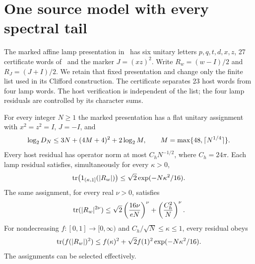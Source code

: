 \section{One source model with every spectral tail}\label{sec:source}
The marked affine lamp presentation in~\cite[Section P2]{UP} has six unitary letters $p,q,t,d,x,z$, 27 certificate words of~\cite[Definition 7.1]{Game} and the marker $J=(xz)^2$. Write $R_w=(w-I)/2$ and $R_J=(J+I)/2$. We retain that fixed presentation and change only the finite list used in its Clifford construction. The certificate separates 23 host words from four lamp words. The host verification is independent of the list; the four lamp residuals are controlled by its character sums.

\begin{lemma}\label{lem:tail}
For every integer $N\ge1$ the marked presentation has a flat unitary assignment with $x^2=z^2=I$, $J=-I$, and
\begin{equation}\label{eq:source-dim}
 \log_2 D_N\le 3N+(4M+4)^2+2\log_2 M,
 \qquad M=\max\{48,\lceil N^{1/4}\rceil\}.
\end{equation}
Every host residual has operator norm at most $C_hN^{-1/2}$, where $C_h=24\pi$. Each lamp residual satisfies, simultaneously for every $\kappa>0$,
\begin{equation}\label{eq:tail}
 \operatorname{tr}\bigl(1_{(\kappa,1]}(|R_w|)\bigr)
 \le\sqrt2\exp(-N\kappa^2/16).
\end{equation}
The same assignment, for every real $\nu>0$, satisfies
\begin{equation}\label{eq:moments}
 \operatorname{tr}(|R_w|^{2\nu})\le
 \sqrt2\left(\frac{16\nu}{eN}\right)^\nu+
 \left(\frac{C_h^2}{N}\right)^\nu.
\end{equation}
For nondecreasing $f:[0,1]\to[0,\infty)$ and $C_h/\sqrt N\le\kappa\le1$, every residual obeys
\begin{equation}\label{eq:split}
 \operatorname{tr}(f(|R_w|)^2)\le f(\kappa)^2+
 \sqrt2 f(1)^2\exp(-N\kappa^2/16).
\end{equation}
The assignments can be selected effectively.
\end{lemma}
